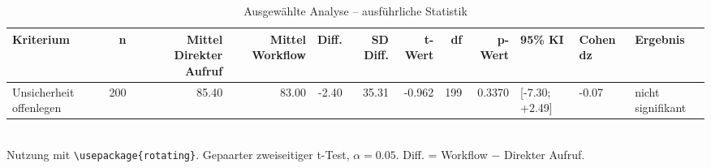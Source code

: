 \begin{table}
\centering
\caption{Ausgewählte Analyse -- ausführliche Statistik}
\begin{tabular}{lrrrrrrrrlll}
\toprule
Kriterium & n & Mittel Direkter Aufruf & Mittel Workflow & Diff. & SD Diff. & t-Wert & df & p-Wert & 95\% KI & Cohen dz & Ergebnis \\
\midrule
Unsicherheit offenlegen & 200 & 85.40 & 83.00 & -2.40 & 35.31 & -0.962 & 199 & 0.3370 & [-7.30; +2.49] & -0.07 & nicht signifikant \\
\bottomrule
\end{tabular}
\\[2mm]
\footnotesize Nutzung mit \texttt{\textbackslash usepackage\{rotating\}}. Gepaarter zweiseitiger t-Test, $\alpha=0.05$. Diff. = Workflow $-$ Direkter Aufruf.
\end{table}
